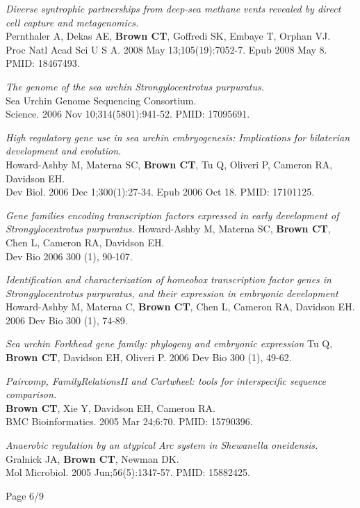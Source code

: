 \documentclass[margin,line]{resume}
\begin{document}
\begin{resume}
{\em Diverse syntrophic partnerships from deep-sea methane vents revealed by direct cell capture and metagenomics.}\\
Pernthaler A, Dekas AE, {\bf Brown CT}, Goffredi SK, Embaye T, Orphan VJ.\\
Proc Natl Acad Sci U S A. 2008 May
13;105(19):7052-7. Epub 2008 May 8.  PMID: 18467493.

{\em The genome of the sea urchin Strongylocentrotus purpuratus.}\\
Sea Urchin Genome Sequencing Consortium.\\
Science. 2006 Nov 10;314(5801):941-52.
PMID: 17095691.

{\em High regulatory gene use in sea urchin embryogenesis: Implications for bilaterian development and evolution.}\\
Howard-Ashby M, Materna SC, {\bf Brown CT}, Tu Q, Oliveri P, Cameron RA, Davidson EH.\\
Dev Biol. 2006 Dec 1;300(1):27-34. Epub 2006 Oct 18.
PMID: 17101125.

{\em Gene families encoding transcription factors expressed in early development of Strongylocentrotus purpuratus.}
Howard-Ashby M, Materna SC, {\bf Brown CT}, Chen L, Cameron RA, Davidson EH.\\
Dev Bio 2006 300 (1), 90-107.

{\em Identification and characterization of homeobox transcription factor genes in Strongylocentrotus purpuratus, and their expression in embryonic development}
Howard-Ashby M, Materna C, {\bf Brown CT}, Chen L, Cameron RA, Davidson EH.
2006 Dev Bio 300 (1), 74-89.

{\em Sea urchin Forkhead gene family: phylogeny and embryonic expression}
Tu Q, {\bf Brown CT}, Davidson EH, Oliveri P.
2006 Dev Bio 300 (1), 49-62.

{\em Paircomp, FamilyRelationsII and Cartwheel: tools for interspecific sequence comparison.}\\
{\bf Brown CT}, Xie Y, Davidson EH, Cameron RA.\\
BMC Bioinformatics. 2005 Mar 24;6:70.
PMID: 15790396.

{\em Anaerobic regulation by an
atypical Arc system in {\em Shewanella oneidensis}.}\\
Gralnick JA, {\bf Brown CT}, Newman DK.\\
Mol Microbiol. 2005
Jun;56(5):1347-57.  PMID: 15882425.

\vspace{2cm}
{\centerline {Page 6/9}}


\end{resume}
\end{document}
